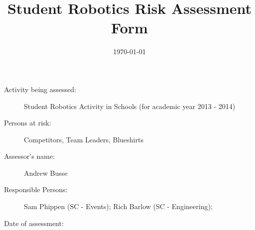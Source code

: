 \documentclass[12pt,a4paper]{scrartcl}
\title{Student Robotics Risk Assessment Form}
\begin{document}
\maketitle

\begin{description}
\item[Activity being assessed:] Student Robotics Activity in Schools (for
academic year 2013 - 2014)
\item[Persons at risk:] Competitors, Team Leaders, Blueshirts
\end{description}

\begin{description}
\item[Assessor's name:] Andrew Busse
\item[Responsible Persons:] Sam Phippen (SC - Events); Rich Barlow (SC -
Engineering); 
\item[Date of assessment:] \date{\today}
\end{description}
\clearpage

\newcommand{\risk}[4]{
 #1 & #2 & #3 & #4 \\
}
\end{document}
